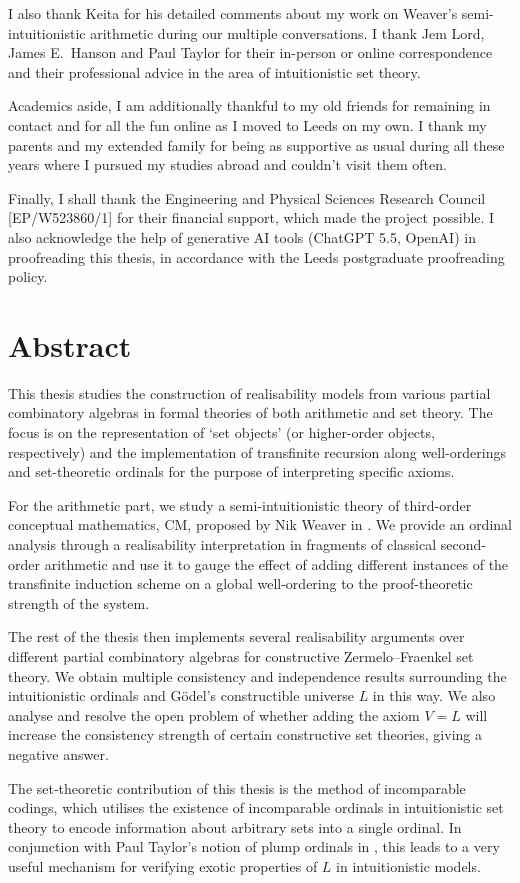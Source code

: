 \documentclass[12pt,openany]{book}
\newcommand\auxitoc[1]\relax
\renewcommand\auxitoc[1]{\addcontentsline{toc}{section}{\protect #1}}}
\renewcommand\auxitoc[1]{\addcontentsline{toc}{chapter}{\protect\numberline{}#1}}}
\newcommand\frontsection[1]{\clearpage\section*{\LARGE #1}\auxitoc{#1}}
\theoremstyle{plain}
\theoremstyle{definition}
\newcommand\CM{\mathrm{CM}}
\begin{document}
I also thank Keita for his detailed comments about my work on Weaver's semi-intuitionistic arithmetic during our multiple conversations. I thank Jem Lord, James E.\ Hanson and Paul Taylor for their in-person or online correspondence and their professional advice in the area of intuitionistic set theory.

Academics aside, I am additionally thankful to my old friends for remaining in contact and for all the fun online as I moved to Leeds on my own. I thank my parents and my extended family for being as supportive as usual during all these years where I pursued my studies abroad and couldn't visit them often.

Finally, I shall thank the Engineering and Physical Sciences Research Council [EP/W523860/1] for their financial support, which made the project possible. I also acknowledge the help of generative AI tools (ChatGPT 5.5, OpenAI) in proofreading this thesis, in accordance with the Leeds postgraduate proofreading policy.

\frontsection{Abstract}

This thesis studies the construction of realisability models from various partial combinatory algebras in formal theories of both arithmetic and set theory. The focus is on the representation of `set objects' (or higher-order objects, respectively) and the implementation of transfinite recursion along well-orderings and set-theoretic ordinals for the purpose of interpreting specific axioms.

For the arithmetic part, we study a semi-intuitionistic theory of third-order conceptual mathematics, $\CM$, proposed by Nik Weaver in \cite{weaver09-cm}. We provide an ordinal analysis through a realisability interpretation in fragments of classical second-order arithmetic and use it to gauge the effect of adding different instances of the transfinite induction scheme on a global well-ordering to the proof-theoretic strength of the system.

The rest of the thesis then implements several realisability arguments over different partial combinatory algebras for constructive Zermelo--Fraenkel set theory. We obtain multiple consistency and independence results surrounding the intuitionistic ordinals and G\"odel's constructible universe $L$ in this way. We also analyse and resolve the open problem of whether adding the axiom $V = L$ will increase the consistency strength of certain constructive set theories, giving a negative answer.

The set-theoretic contribution of this thesis is the method of incomparable codings, which utilises the existence of incomparable ordinals in intuitionistic set theory to encode information about arbitrary sets into a single ordinal. In conjunction with Paul Taylor's notion of plump ordinals in \cite{taylor96-intuitionistic-ordinals}, this leads to a very useful mechanism for verifying exotic properties of $L$ in intuitionistic models.
\end{document}

